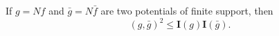 If $g = Nf$ and $\bar{g} = N\bar{f}$ are two potentials of finite support, then
$$(g, \bar{g})^2 \leq \mathbf{I}(g)\mathbf{I}(\bar{g}).$$
